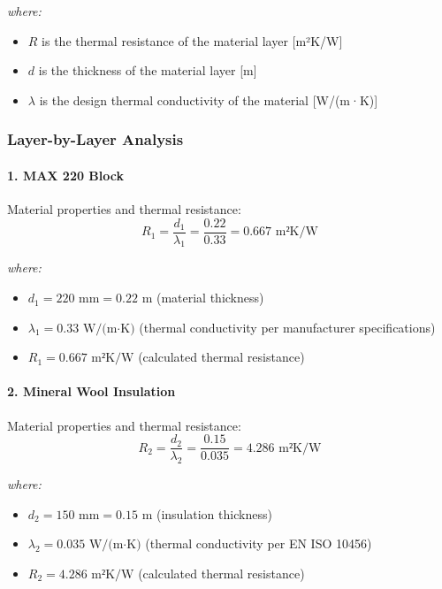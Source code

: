 \documentclass[12pt,a4paper]{article}
\begin{document}
\noindent
\textit{where:}
\begin{itemize}
    \item $R$ is the thermal resistance of the material layer [m²K/W]
    \item $d$ is the thickness of the material layer [m]
    \item $\lambda$ is the design thermal conductivity of the material [W/(m·K)]
\end{itemize}

\subsubsection{Layer-by-Layer Analysis}
\paragraph{1. MAX 220 Block}
Material properties and thermal resistance:
\begin{equation}
R_1 = \frac{d_1}{\lambda_1} = \frac{0.22}{0.33} = 0.667 \text{ m²K/W}
\end{equation}

\noindent
\textit{where:}
\begin{itemize}
    \item $d_1 = 220 \text{ mm} = 0.22 \text{ m}$ (material thickness)
    \item $\lambda_1 = 0.33 \text{ W/(m·K)}$ (thermal conductivity per manufacturer specifications)
    \item $R_1 = 0.667 \text{ m²K/W}$ (calculated thermal resistance)
\end{itemize}

\paragraph{2. Mineral Wool Insulation}
Material properties and thermal resistance:
\begin{equation}
R_2 = \frac{d_2}{\lambda_2} = \frac{0.15}{0.035} = 4.286 \text{ m²K/W}
\end{equation}

\noindent
\textit{where:}
\begin{itemize}
    \item $d_2 = 150 \text{ mm} = 0.15 \text{ m}$ (insulation thickness)
    \item $\lambda_2 = 0.035 \text{ W/(m·K)}$ (thermal conductivity per EN ISO 10456)
    \item $R_2 = 4.286 \text{ m²K/W}$ (calculated thermal resistance)
\end{itemize}
\end{document}
